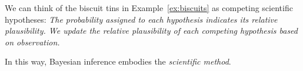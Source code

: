 %
\begin{remark}%
We can think of the biscuit tins in Example~\ref{ex:biscuits} as competing scientific hypotheses:
\bit
\it The probability assigned to each hypothesis indicates its \emph{relative plausibility}.
\it We update the relative plausibility of each competing hypothesis based on \emph{observation}.
\eit

In this way, Bayesian inference embodies the \emph{scientific method}.
\end{remark}


